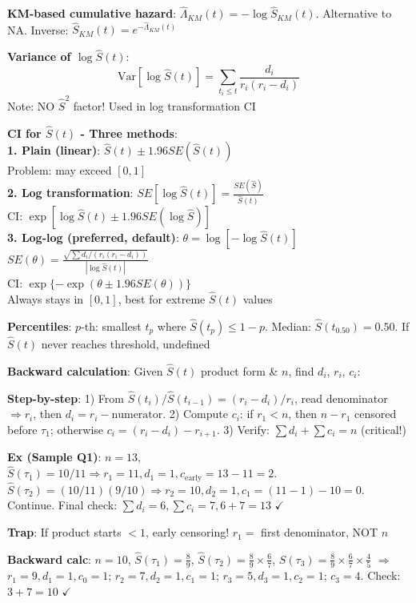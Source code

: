 ﻿\documentclass[10pt,letterpaper]{extarticle}
\newcommand{\h}[1]{\textbf{#1}}
\begin{document}
\begin{multicols}{3}
\h{KM-based cumulative hazard}: $\hat{\Lambda}_{KM}(t) = -\log \hat{S}_{KM}(t)$. Alternative to NA. Inverse: $\hat{S}_{KM}(t) = e^{-\hat{\Lambda}_{KM}(t)}$

\h{Variance of $\log\hat{S}(t)$}: \\
$$\text{Var}[\log\hat{S}(t)] = \sum_{t_i \le t} \frac{d_i}{r_i(r_i-d_i)}$$
Note: NO $\hat{S}^2$ factor! Used in log transformation CI

\h{CI for $\hat{S}(t)$ - Three methods}: \\
\textbf{1. Plain (linear)}: $\hat{S}(t) \pm 1.96 SE(\hat{S}(t))$ \\
Problem: may exceed $[0,1]$ \\
\textbf{2. Log transformation}: $SE[\log\hat{S}(t)] = \frac{SE(\hat{S})}{\hat{S}(t)}$ \\
CI: $\exp[\log\hat{S}(t) \pm 1.96 SE(\log\hat{S})]$ \\
\textbf{3. Log-log (preferred, default)}: $\theta = \log[-\log\hat{S}(t)]$ \\
$SE(\theta) = \frac{\sqrt{\sum d_i/(r_i(r_i-d_i))}}{|\log\hat{S}(t)|}$ \\
CI: $\exp\{-\exp(\theta \pm 1.96 SE(\theta))\}$ \\
Always stays in $[0,1]$, best for extreme $\hat{S}(t)$ values

\h{Percentiles}: $p$-th: smallest $t_p$ where $\hat{S}(t_p) \le 1-p$. Median: $\hat{S}(t_{0.50}) = 0.50$. If $\hat{S}(t)$ never reaches threshold, undefined

\h{Backward calculation}: Given $\hat{S}(t)$ product form \& $n$, find $d_i$, $r_i$, $c_i$:

\h{Step-by-step}: 1) From $\hat{S}(t_i)/\hat{S}(t_{i-1}) = (r_i-d_i)/r_i$, read denominator $\Rightarrow r_i$, then $d_i=r_i-\text{numerator}$. 2) Compute $c_i$: if $r_1<n$, then $n-r_1$ censored before $\tau_1$; otherwise $c_i = (r_i-d_i) - r_{i+1}$. 3) Verify: $\sum d_i + \sum c_i = n$ (critical!)

\h{Ex (Sample Q1)}: $n=13$, $\hat{S}(\tau_1)=10/11 \Rightarrow r_1=11, d_1=1, c_{\text{early}}=13-11=2$. $\hat{S}(\tau_2)=(10/11)(9/10) \Rightarrow r_2=10, d_2=1, c_1=(11-1)-10=0$. Continue. Final check: $\sum d_i=6, \sum c_i=7, 6+7=13$ $\checkmark$

\h{Trap}: If product starts $<1$, early censoring! $r_1 = $ first denominator, NOT $n$

\h{Backward calc}: $n=10$, $\hat{S}(\tau_1)=\frac{8}{9}$, $\hat{S}(\tau_2)=\frac{8}{9} \times \frac{6}{7}$, $\hat{S}(\tau_3)=\frac{8}{9} \times \frac{6}{7} \times \frac{4}{5}$ $\Rightarrow$ $r_1=9, d_1=1, c_0=1$; $r_2=7, d_2=1, c_1=1$; $r_3=5, d_3=1, c_2=1$; $c_3=4$. Check: $3+7=10$ $\checkmark$


\end{multicols}
\end{document}
